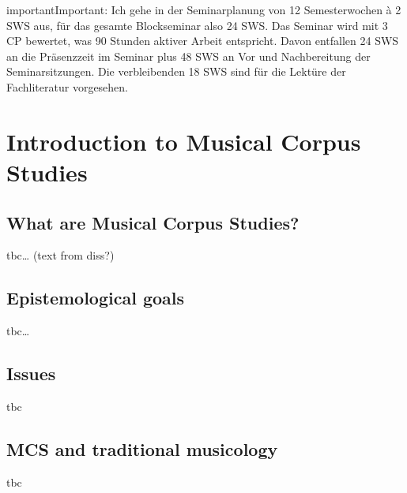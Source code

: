 \documentclass[letterpaper,10pt,english]{sphinxmanual}
\begin{document}
\begin{sphinxadmonition}{important}{Important:}
Ich gehe in der Seminarplanung von 12 Semesterwochen à 2 SWS aus, für das gesamte Blockseminar also 24 SWS.
Das Seminar wird mit 3 CP bewertet, was 90 Stunden aktiver Arbeit entspricht.
Davon entfallen 24 SWS an die Präsenzzeit im Seminar plus 48 SWS an Vor\sphinxhyphen{} und Nachbereitung der Seminarsitzungen.
Die verbleibenden 18 SWS sind für die Lektüre der Fachliteratur vorgesehen.
\end{sphinxadmonition}


\chapter{Introduction to Musical Corpus Studies}
\label{\detokenize{2_introduction:introduction-to-musical-corpus-studies}}\label{\detokenize{2_introduction::doc}}


\section{What are Musical Corpus Studies?}
\label{\detokenize{2_introduction:what-are-musical-corpus-studies}}
tbc… (text from diss?)


\section{Epistemological goals}
\label{\detokenize{2_introduction:epistemological-goals}}
tbc…


\section{Issues}
\label{\detokenize{2_introduction:issues}}
tbc 


\section{MCS and traditional musicology}
\label{\detokenize{2_introduction:mcs-and-traditional-musicology}}
tbc
\end{document}
